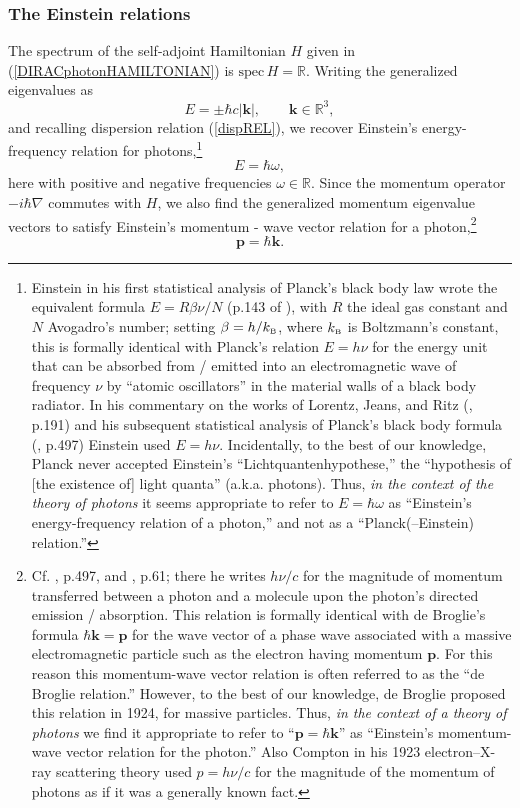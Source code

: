 \documentclass[11pt]{article}
\theoremstyle{definition}
\newcommand{\refeq}[1]{(\ref{#1})}
\newcommand{\vect}[1] {\boldsymbol{{ #1}} }
\newcommand{\kV}{{\vect{k}}}		%
\newcommand{\pV}{{\vect{p}}}            %
\numberwithin{equation}{section}
\newcommand{\beq}{\begin{equation}}
\newcommand{\eeq}{\end{equation}}
\newcommand{\Rset}{{\mathbb R}}
\newcommand{\nab}{\nabla}
\begin{document}
\subsubsection{The Einstein relations}\vspace{-5pt}

 The spectrum of the self-adjoint Hamiltonian $H$ given in \refeq{DIRACphotonHAMILTONIAN} is ${\mathrm{spec}\,}H=\Rset$.
 Writing the generalized eigenvalues as
\beq 
\label{HAMILTONIANspec}
E=\pm \hbar c|\kV|, \qquad \kV\in\Rset^3,
\eeq
and recalling dispersion relation \refeq{dispREL}, we recover Einstein's energy-frequency relation for photons,\footnote{Einstein 
  in his first statistical analysis of Planck's 
  black body law wrote  the equivalent formula $E=R\beta\nu/N$ (p.143 of \cite{EinsteinPHOTONa}), with $R$ the ideal gas constant and 
  $N$ Avogadro's number; setting $\beta=h/k_{\mbox{\tiny{B}}}$, where $k_{\mbox{\tiny{B}}}$ is Boltzmann's constant, this is formally 
  identical with Planck's relation $E=h\nu$ for the energy unit that can be absorbed from / emitted into an 
  electromagnetic wave of frequency $\nu$ by ``atomic oscillators'' in the material walls of a black body radiator.
    In his commentary on the works of Lorentz, Jeans, and Ritz (\cite{EinsteinPHOTONb}, p.191) and his 
  subsequent statistical analysis of Planck's black body formula (\cite{EinsteinPHOTONbb}, p.497) Einstein used $E=h\nu$. 
    Incidentally, to the best of our knowledge, Planck never accepted Einstein's ``Lichtquantenhypothese,'' the ``hypothesis of 
  [the existence of] light quanta'' (a.k.a. photons).
    Thus, \emph{in the context of the theory of photons} it seems appropriate to refer to $E=\hbar\omega$ as 
 ``Einstein's energy-frequency relation of a photon,'' and not as a ``Planck(--Einstein) relation.''}
\beq 
\label{EinsteinEomega}
E=\hbar \omega,
\eeq
here with positive and negative frequencies $\omega\in\Rset$.
 Since the momentum operator $-i\hbar\nab$ commutes with $H$, we also find the generalized momentum eigenvalue vectors to
satisfy Einstein's momentum - wave vector relation for a photon,\footnote{Cf. \cite{EinsteinPHOTONbb}, p.497, 
and \cite{EinsteinPHOTONc},  p.61; there he writes $h\nu/c$ for the magnitude of momentum transferred between a photon and 
 a molecule upon the photon's directed emission / absorption. 
   This relation is formally identical with de Broglie's formula
 $\hbar\kV =\pV$ for the wave vector of a phase wave associated with a massive electromagnetic particle such as the electron 
 having  momentum $\pV$.
   For this reason this momentum-wave vector relation is often referred to as the ``de Broglie relation.''
   However, to the best of our knowledge, de Broglie proposed this relation  in 1924, for massive particles. 
   Thus, \emph{in the context of a theory of photons} we find it appropriate to refer to ``$\pV=\hbar\kV$'' 
 as ``Einstein's momentum-wave vector relation for the photon.''
   Also Compton in his 1923 electron--X-ray scattering theory  \cite{Compton} 
 used $p=h\nu/c$ for the magnitude of the momentum of photons as if it was a generally known fact.}
\beq 
\label{EinsteinPk}
\pV=\hbar\kV.
\eeq
\end{document}
